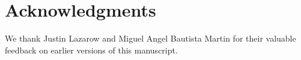 \section*{Acknowledgments}
We thank Justin Lazarow and Miguel Angel Bautista Martin for their valuable feedback
on earlier versions of this manuscript.
